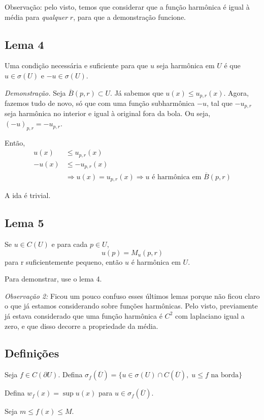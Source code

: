 \documentclass[11pt]{article}
\newcommand{\p}{\partial}
\begin{document}
Observação: pelo visto, temos que considerar que a função harmônica é igual à média para \textit{qualquer} \(r\), para que a demonstração funcione.

\subsection*{Lema 4}

Uma condição necessária e suficiente para que \(u\) seja harmônica em \(U\) é que \(u \in \sigma(U)\) e \(-u \in \sigma(U)\).

\textit{Demonstração.} Seja \(\overline{B}(p,r) \subset U\). Já sabemos que \(u(x) \leq u_{p,r}(x)\). Agora, fazemos tudo de novo, só que com uma função subharmônica \(-u\), tal que \(-u_{p,r}\) seja harmônica no interior e igual à original fora da bola. Ou seja, \((-u)_{p,r} = -u_{p,r}\).

Então, \begin{align*}
	u(x) &\leq u_{p,r}(x) \\
	-u(x) &\leq -u_{p,r}(x) \\
	&\Rightarrow u(x) = u_{p,r}(x) \Rightarrow u \text{ é harmônica em } \overline{B}(p,r)
\end{align*}

A ida é trivial.

\subsection*{Lema 5}
Se \(u \in C(U)\) e para cada \(p \in U\), \[u(p) = M_u(p,r)\] para r suficientemente pequeno, então \(u\) é harmônica em \(U\).

Para demonstrar, use o lema 4.

\textit{Observação 2:} Ficou um pouco confuso esses últimos lemas porque não ficou claro o que já estamos considerando sobre funções harmônicas. Pelo visto, previamente já estava considerado que uma função harmônica é \(C^2\) com laplaciano igual a zero, e que disso decorre a propriedade da média.

\subsection*{Definições}
Seja \(f \in C(\p U)\). Defina \(\sigma_f(\overline{U}) =\{ u \in \sigma(U) \cap C(\overline{U}), \; u \leq f \text{ na borda}\}\)

Defina \(w_f(x) = \sup u(x)\) para \( u \in \sigma_f(\overline{U}) \).

Seja \(m \leq f(x) \leq M\).
\end{document}
